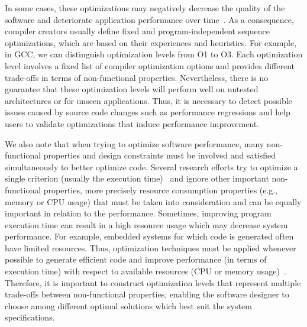 In some cases, these optimizations may negatively decrease the quality of the software and deteriorate application performance over time~\cite{molyneaux2009art}. 
As a consequence, compiler creators usually define fixed and program-independent sequence optimizations, which are based on their experiences and heuristics. For example, in GCC, we can distinguish optimization levels from O1 to O3. Each optimization level involves a fixed list of compiler optimization options and provides different trade-offs in terms of non-functional properties.
Nevertheless, there is no guarantee that these optimization levels will perform well on untested architectures or for unseen applications. 
Thus, it is necessary to detect possible issues caused by source code changes such as performance regressions and help users to validate optimizations that induce performance improvement.

We also note that when trying to optimize software performance,
many non-functional properties and design constraints must be involved and satisfied simultaneously to better optimize code.
Several research efforts try to optimize a single criterion (usually the execution time)~\cite{ballal2015compiler,chen2012deconstructing,demertzi2011analyzing} and ignore other important non-functional properties, more precisely resource consumption properties (e.g., memory or CPU usage) that must be taken into consideration and can be equally important in relation to the performance. Sometimes, improving program execution time can result in a high resource usage which may decrease system performance. For example, embedded systems for which code is generated often have limited resources. Thus, optimization techniques must be applied whenever possible to generate efficient code and improve performance (in terms of execution time) with respect to available resources (CPU or memory usage)~\cite{nagiub2013automatic}.
Therefore, it is important to construct optimization levels that represent multiple trade-offs between non-functional properties, enabling the software designer to choose among different optimal solutions which best suit the system specifications.







